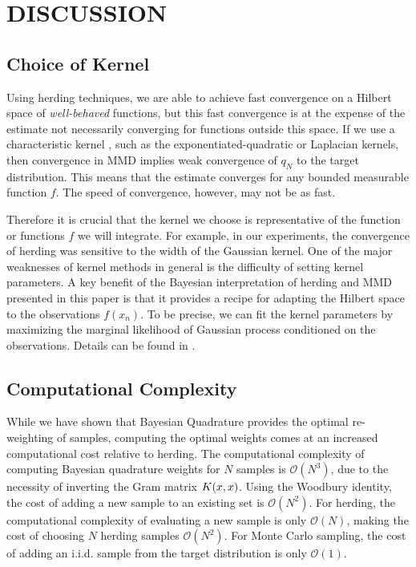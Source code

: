 \documentclass[]{article}
\begin{document}
\section{DISCUSSION}

\subsection{Choice of Kernel}

Using herding techniques, we are able to achieve fast convergence on a Hilbert space of \emph{well-behaved} functions, but this fast convergence is at the expense of the estimate not necessarily converging for functions outside this space.
If we use a characteristic kernel \citep{Sriperumbudur2010}, such as the exponentiated-quadratic or Laplacian kernels, then convergence in MMD implies weak convergence of $q_N$ to the target distribution. 
This means that the estimate converges for any bounded measurable function $f$. The speed of convergence, however, may not be as fast.

Therefore it is crucial that the kernel we choose is representative of the function or functions $f$ we will integrate.  For example, in our experiments, the convergence of herding was sensitive to the width of the Gaussian kernel.  One of the major weaknesses of kernel methods in general is the difficulty of setting kernel parameters.  A key benefit of the Bayesian interpretation of herding and MMD presented in this paper is that it provides a recipe for adapting the Hilbert space to the observations $f(x_n)$.  To be precise, we can fit the kernel parameters by maximizing the marginal likelihood of Gaussian process conditioned on the observations.  Details can be found in \citep{rasmussen38gaussian}.

\subsection{Computational Complexity}

While we have shown that Bayesian Quadrature provides the optimal re-weighting of samples, computing the optimal weights comes at an increased computational cost relative to herding. 
%
The computational complexity of computing Bayesian quadrature weights for $N$ samples is $\mathcal{O}(N^3)$, due to the necessity of inverting the Gram matrix $K({x}, {x})$.  Using the Woodbury identity, the cost of adding a new sample to an existing set is $\mathcal{O}(N^2)$.  For herding, the computational complexity of evaluating a new sample is only $\mathcal{O}(N)$, making the cost of choosing $N$ herding samples $\mathcal{O}(N^2)$.  For Monte Carlo sampling, the cost of adding an i.i.d. sample from the target distribution is only $\mathcal{O}(1)$.
\end{document}
